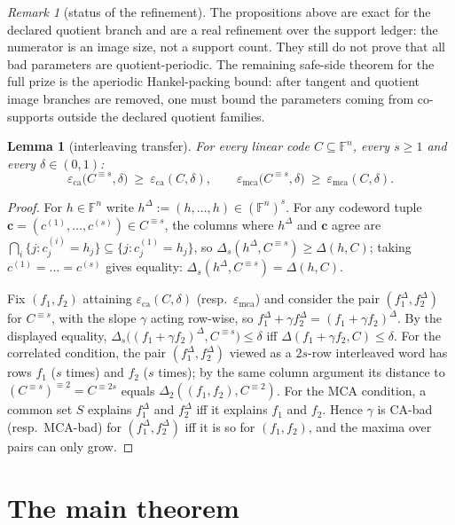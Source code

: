 \documentclass[11pt]{article}
\newtheorem{lemma}[theorem]{Lemma}
\theoremstyle{definition}
\theoremstyle{remark}
\newtheorem{remark}[theorem]{Remark}
\newcommand{\F}{\mathbb{F}}
\newcommand{\eca}{\varepsilon_{\mathrm{ca}}}
\newcommand{\emca}{\varepsilon_{\mathrm{mca}}}
\newcommand{\dist}{\Delta}
\begin{document}
\begin{remark}[status of the refinement]
\label{rem:distinct-ledger-status}
The propositions above are exact for the declared quotient branch and are a real
refinement over the support ledger: the numerator is an image size, not a support
count.  They still do not prove that all bad parameters are quotient-periodic.
The remaining safe-side theorem for the full prize is the aperiodic Hankel-packing
bound: after tangent and quotient image branches are removed, one must bound the
parameters coming from co-supports outside the declared quotient families.
\end{remark}


\begin{lemma}[interleaving transfer]\label{lem:inter}
For every linear code $C\subseteq\F^n$, every $s\ge1$ and every $\delta\in(0,1)$:
\[
\eca\bigl(C^{\equiv s},\delta\bigr)\ \ge\ \eca(C,\delta),
\qquad
\emca\bigl(C^{\equiv s},\delta\bigr)\ \ge\ \emca(C,\delta).
\]
\end{lemma}

\begin{proof}
For $h\in\F^n$ write $h^{\Delta}:=(h,\dots,h)\in(\F^n)^s$. For any codeword tuple $\mathbf c=(c^{(1)},\dots,c^{(s)})\in C^{\equiv s}$, the columns where $h^\Delta$ and $\mathbf c$ agree are $\bigcap_i\{j:c^{(i)}_j=h_j\}\subseteq\{j:c^{(1)}_j=h_j\}$, so $\dist_s(h^\Delta,C^{\equiv s})\ge\dist(h,C)$; taking $c^{(1)}=\dots=c^{(s)}$ gives equality:
$\dist_s(h^\Delta,C^{\equiv s})=\dist(h,C)$.

Fix $(f_1,f_2)$ attaining $\eca(C,\delta)$ (resp.\ $\emca$) and consider the pair $(f_1^\Delta,f_2^\Delta)$ for $C^{\equiv s}$, with the slope $\gamma$ acting row-wise, so $f_1^\Delta+\gamma f_2^\Delta=(f_1+\gamma f_2)^\Delta$. By the displayed equality, $\dist_s\bigl((f_1+\gamma f_2)^\Delta,C^{\equiv s}\bigr)\le\delta$ iff $\dist(f_1+\gamma f_2,C)\le\delta$. For the correlated condition, the pair $(f_1^\Delta,f_2^\Delta)$ viewed as a $2s$-row interleaved word has rows $f_1$ ($s$ times) and $f_2$ ($s$ times); by the same column argument its distance to $(C^{\equiv s})^{\equiv2}=C^{\equiv2s}$ equals $\dist_2((f_1,f_2),C^{\equiv2})$. For the MCA condition, a common set $S$ explains $f_1^\Delta$ and $f_2^\Delta$ iff it explains $f_1$ and $f_2$. Hence $\gamma$ is CA-bad (resp.\ MCA-bad) for $(f_1^\Delta,f_2^\Delta)$ iff it is so for $(f_1,f_2)$, and the maxima over pairs can only grow.
\end{proof}

\section{The main theorem}\label{sec:main}
\end{document}
